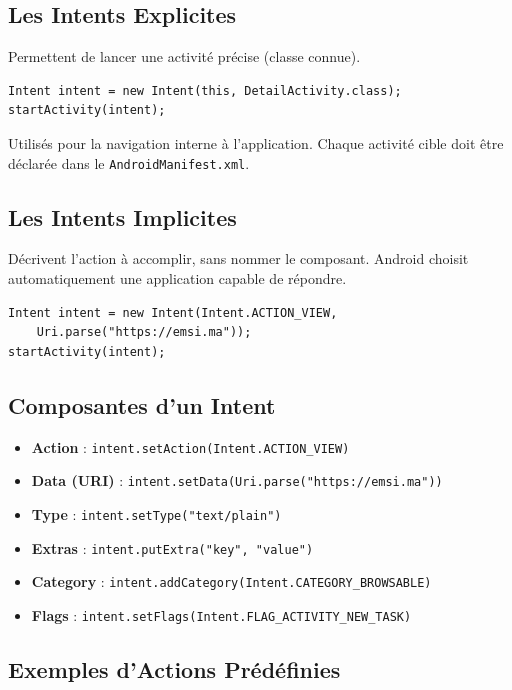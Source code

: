 \documentclass[11pt,a4paper]{article}
\begin{document}
\subsection{Les Intents Explicites}

Permettent de lancer une activité précise (classe connue).

\begin{lstlisting}
Intent intent = new Intent(this, DetailActivity.class);
startActivity(intent);
\end{lstlisting}

Utilisés pour la navigation interne à l'application. Chaque activité cible doit être déclarée dans le \texttt{AndroidManifest.xml}.

\subsection{Les Intents Implicites}

Décrivent l'action à accomplir, sans nommer le composant. Android choisit automatiquement une application capable de répondre.

\begin{lstlisting}
Intent intent = new Intent(Intent.ACTION_VIEW, 
    Uri.parse("https://emsi.ma"));
startActivity(intent);
\end{lstlisting}

\subsection{Composantes d'un Intent}

\begin{itemize}
    \item \textbf{Action} : \texttt{intent.setAction(Intent.ACTION\_VIEW)}
    \item \textbf{Data (URI)} : \texttt{intent.setData(Uri.parse("https://emsi.ma"))}
    \item \textbf{Type} : \texttt{intent.setType("text/plain")}
    \item \textbf{Extras} : \texttt{intent.putExtra("key", "value")}
    \item \textbf{Category} : \texttt{intent.addCategory(Intent.CATEGORY\_BROWSABLE)}
    \item \textbf{Flags} : \texttt{intent.setFlags(Intent.FLAG\_ACTIVITY\_NEW\_TASK)}
\end{itemize}

\subsection{Exemples d'Actions Prédéfinies}
\end{document}
